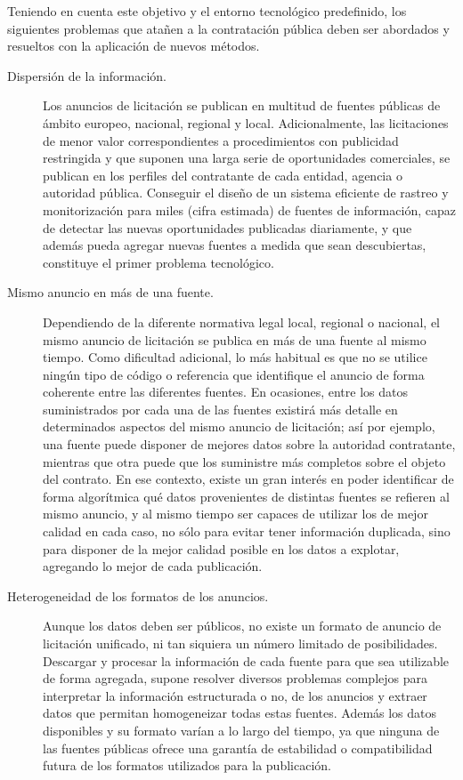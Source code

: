 Teniendo en cuenta este objetivo y el entorno tecnológico predefinido, los siguientes
problemas que atañen a la contratación pública deben ser abordados y resueltos con la
aplicación de nuevos métodos.

\begin{description}
 \item  [Dispersión de la información.] Los anuncios de licitación se publican en multitud de fuentes
públicas de ámbito europeo, nacional, regional y local. Adicionalmente, las licitaciones de menor
valor correspondientes a procedimientos con publicidad restringida y que suponen una larga
serie de oportunidades comerciales, se publican en los perfiles del contratante de cada
entidad, agencia o autoridad pública. Conseguir el diseño de un sistema eficiente de rastreo y
monitorización para miles (cifra estimada) de fuentes de información, capaz de detectar las
nuevas oportunidades publicadas diariamente, y que además pueda agregar nuevas fuentes a
medida que sean descubiertas, constituye el primer problema tecnológico.

\item [Mismo anuncio en más de una fuente.] Dependiendo de la diferente normativa legal local,
regional o nacional, el mismo anuncio de licitación se publica en más de una fuente al
mismo tiempo. Como dificultad adicional, lo más habitual es que no se utilice ningún tipo de
código o referencia que identifique el anuncio de forma coherente entre las diferentes
fuentes. En ocasiones, entre los datos suministrados por cada una de las fuentes existirá más
detalle en determinados aspectos del mismo anuncio de licitación; así por ejemplo, una fuente
puede disponer de mejores datos sobre la autoridad contratante, mientras que otra puede que los suministre
más completos sobre el objeto del contrato. En ese contexto, existe un gran interés en poder
identificar de forma algorítmica qué datos provenientes de distintas fuentes se refieren al
mismo anuncio, y al mismo tiempo ser capaces de utilizar los de mejor calidad en cada caso,
no sólo para evitar tener información duplicada, sino para disponer de la mejor calidad posible
en los datos a explotar, agregando lo mejor de cada publicación.

\item [Heterogeneidad de los formatos de los anuncios.] Aunque los datos deben ser públicos, no
existe un formato de anuncio de licitación unificado, ni tan siquiera un número limitado de
posibilidades. Descargar y procesar la información de cada fuente para que sea utilizable de
forma agregada, supone resolver diversos problemas complejos para interpretar la información
estructurada o no, de los anuncios y extraer datos que permitan
homogeneizar todas estas fuentes. Además los datos disponibles y su formato varían a lo largo
del tiempo, ya que ninguna de las fuentes públicas ofrece una garantía de estabilidad o
compatibilidad futura de los formatos utilizados para la publicación.


\end{description}

